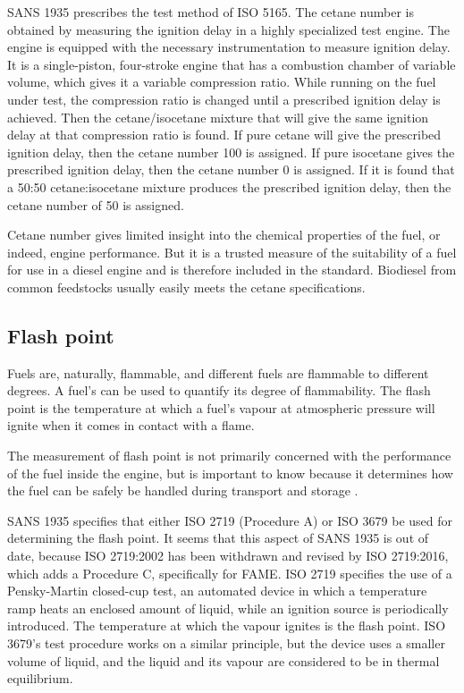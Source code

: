 SANS 1935 prescribes the test method of ISO 5165. The cetane number is obtained
by measuring the ignition delay in a highly specialized test engine. The engine
is equipped with the necessary instrumentation to measure ignition delay. It is
a single-piston, four-stroke engine that has a combustion chamber of variable
volume, which gives it a variable compression ratio. While running on the fuel
under test, the compression ratio is changed until a prescribed ignition delay
is achieved. Then the cetane/isocetane mixture that will give the same ignition
delay at that compression ratio is found. If pure cetane will give the
prescribed ignition delay, then the cetane number 100 is assigned. If pure
isocetane gives the prescribed ignition delay, then the cetane number 0 is
assigned. If it is found that a 50:50 cetane:isocetane mixture produces the
prescribed ignition delay, then the cetane number of 50 is assigned.

Cetane number gives limited insight into the chemical properties of the fuel, or
indeed, engine performance. But it is a trusted measure of the suitability of a
fuel for use in a diesel engine and is therefore included in the standard.
Biodiesel from common feedstocks usually easily meets the cetane specifications.

\subsection{Flash point}

Fuels are, naturally, flammable, and different fuels are flammable to different
degrees. A fuel's  can be used to quantify its degree of
flammability. The flash point is the temperature at which a fuel's vapour at
atmospheric pressure will ignite when it comes in contact with a flame.

The measurement of flash point is not primarily concerned with the performance
of the fuel inside the engine, but is important to know because it determines
how the fuel can be safely be handled during transport and storage
\autocite{WFCC2009}.

SANS 1935 specifies that either ISO 2719 (Procedure A) or ISO 3679 be used for
determining the flash point. It seems that this aspect of SANS 1935 is out of
date, because ISO 2719:2002 has been withdrawn and revised by ISO 2719:2016,
which adds a Procedure C, specifically for FAME. ISO 2719 specifies the use of a
Pensky-Martin closed-cup test, an automated device in which a temperature ramp
heats an enclosed amount of liquid, while an ignition source is periodically
introduced. The temperature at which the vapour ignites is the flash point. ISO
3679's test procedure works on a similar principle, but the device uses a
smaller volume of liquid, and the liquid and its vapour are considered to be in
thermal equilibrium.

